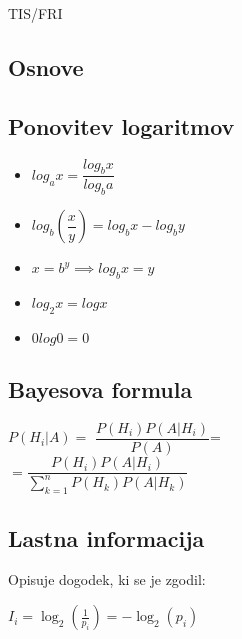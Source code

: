 \documentclass{article}
\begin{document}
\begin{center}
	{\small TIS/FRI \par}
\end{center}


\begin{multicols}{2}
	

	\section{Osnove}

	\subsection{Ponovitev logaritmov}
	\begin{small}
		\begin{itemize}
			\item $log_a x = \dfrac{log_b x}{log_b a}$
			\item $log_b(\dfrac{x}{y}) = log_b x - log_b y$
			\item $x = b^y \implies log_b x = y$
			\item $log_2 x = log x$
			\item $0log0 = 0$
		\end{itemize}
	\end{small}

	\subsection{Bayesova formula}
	\begin{center}
		\begin{math}
			P(H_{i} | A) =
		\end{math}
		\begin{math}
			\dfrac{P(H_{i}) P(A | H_{i})}{P(A)}
		\end{math}=\\
		\begin{math}
			= \dfrac{P(H_{i}) P(A | H_{i})}{\sum_{k=1}^{n} P(H_{k}) P(A | H_{k})}
		\end{math}
	\end{center}

	\subsection{Lastna informacija}
	Opisuje dogodek, ki se je zgodil:
	\begin{center}
		\begin{math}
			I_i = \log_2(\frac{1}{p_i}) = - \log_2(p_i)
		\end{math}
	\end{center}


\end{multicols}
\end{document}
